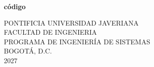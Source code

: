 \begin{titlepage}
    \begin{center}
        \vspace*{1cm}

        \Huge
        \textbf{código}

        \vspace{0.5cm}
        \LARGE
        
        \Huge
        \thetitle
        
        \vspace{0.5cm}
        \LARGE
        
        \vspace{3.5cm}
        
        \theauthor
        
        \vfill

        \large
        PONTIFICIA UNIVERSIDAD JAVERIANA \\
        \vspace{0.5cm}
        FACULTAD DE INGENIERIA \\
        \vspace{0.5cm}
        PROGRAMA DE INGENIERÍA DE SISTEMAS \\
        \vspace{0.5cm}
        BOGOTÁ, D.C. \\
        \vspace{0.5cm}
        2027
        
    \end{center}
\end{titlepage}


